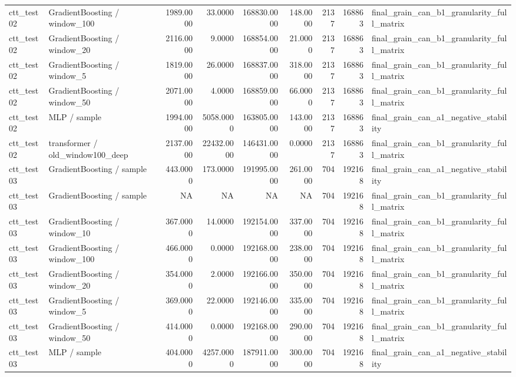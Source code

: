 \begin{tabular}{llrrrrrrl}
ctt\_test02 & GradientBoosting / window\_100 & 1989.0000 & 33.0000 & 168830.0000 & 148.0000 & 2137 & 168863 & final\_grain\_can\_b1\_granularity\_full\_matrix \\
ctt\_test02 & GradientBoosting / window\_20 & 2116.0000 & 9.0000 & 168854.0000 & 21.0000 & 2137 & 168863 & final\_grain\_can\_b1\_granularity\_full\_matrix \\
ctt\_test02 & GradientBoosting / window\_5 & 1819.0000 & 26.0000 & 168837.0000 & 318.0000 & 2137 & 168863 & final\_grain\_can\_b1\_granularity\_full\_matrix \\
ctt\_test02 & GradientBoosting / window\_50 & 2071.0000 & 4.0000 & 168859.0000 & 66.0000 & 2137 & 168863 & final\_grain\_can\_b1\_granularity\_full\_matrix \\
ctt\_test02 & MLP / sample & 1994.0000 & 5058.0000 & 163805.0000 & 143.0000 & 2137 & 168863 & final\_grain\_can\_a1\_negative\_stability \\
ctt\_test02 & transformer / old\_window100\_deep & 2137.0000 & 22432.0000 & 146431.0000 & 0.0000 & 2137 & 168863 & final\_grain\_can\_b1\_granularity\_full\_matrix \\
ctt\_test03 & GradientBoosting / sample & 443.0000 & 173.0000 & 191995.0000 & 261.0000 & 704 & 192168 & final\_grain\_can\_a1\_negative\_stability \\
ctt\_test03 & GradientBoosting / sample & NA & NA & NA & NA & 704 & 192168 & final\_grain\_can\_b1\_granularity\_full\_matrix \\
ctt\_test03 & GradientBoosting / window\_10 & 367.0000 & 14.0000 & 192154.0000 & 337.0000 & 704 & 192168 & final\_grain\_can\_b1\_granularity\_full\_matrix \\
ctt\_test03 & GradientBoosting / window\_100 & 466.0000 & 0.0000 & 192168.0000 & 238.0000 & 704 & 192168 & final\_grain\_can\_b1\_granularity\_full\_matrix \\
ctt\_test03 & GradientBoosting / window\_20 & 354.0000 & 2.0000 & 192166.0000 & 350.0000 & 704 & 192168 & final\_grain\_can\_b1\_granularity\_full\_matrix \\
ctt\_test03 & GradientBoosting / window\_5 & 369.0000 & 22.0000 & 192146.0000 & 335.0000 & 704 & 192168 & final\_grain\_can\_b1\_granularity\_full\_matrix \\
ctt\_test03 & GradientBoosting / window\_50 & 414.0000 & 0.0000 & 192168.0000 & 290.0000 & 704 & 192168 & final\_grain\_can\_b1\_granularity\_full\_matrix \\
ctt\_test03 & MLP / sample & 404.0000 & 4257.0000 & 187911.0000 & 300.0000 & 704 & 192168 & final\_grain\_can\_a1\_negative\_stability \\

\end{tabular}
